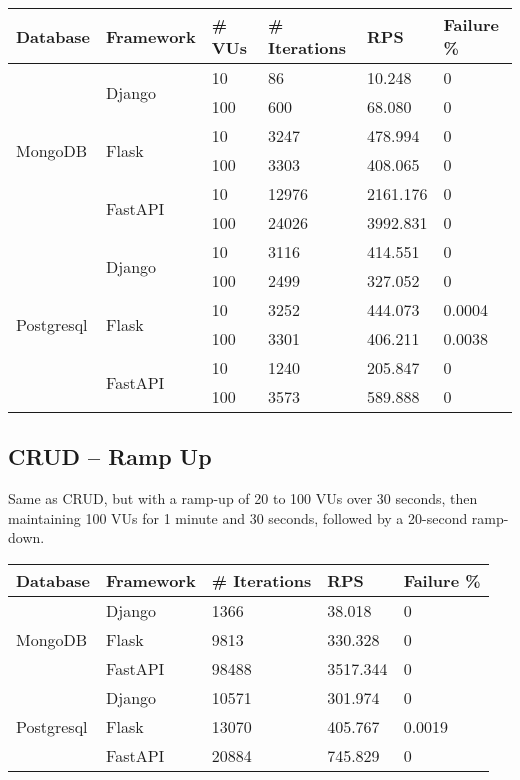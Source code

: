 \documentclass[12pt,onecolumn,a4paper,titlepage]{article}
\begin{document}
{\renewcommand{\arraystretch}{1.5}
\begin{tabular}{| p{1.8cm} | p{2cm} | p{1.3cm} | p{2cm} | p{1.9cm} | p{2cm} |} 
    \hline
    Database & Framework & \# VUs & \# \footnotesize{Iterations} & RPS & \footnotesize{Failure \%} \\
    \hline
    \multirow{6}{*}{MongoDB} & \multirow{2}{*}{Django} & 10 & 86 & 10.248 & 0\\
    & & 100 & 600 & 68.080 & 0\\
    & \multirow{2}{*}{Flask} & 10 & 3247 & 478.994 & 0\\
    & & 100 & 3303 & 408.065 & 0\\
    & \multirow{2}{*}{FastAPI} & 10 & 12976 & 2161.176 & 0\\
    & & 100 & 24026 & 3992.831 & 0\\
    \hline
    \multirow{6}{*}{Postgresql} & \multirow{2}{*}{Django} & 10 & 3116 & 414.551 & 0\\
    & & 100 & 2499 & 327.052 & 0\\
    & \multirow{2}{*}{Flask} & 10 & 3252 & 444.073 & 0.0004\\
    & & 100 & 3301 & 406.211 & 0.0038\\
    & \multirow{2}{*}{FastAPI} & 10 & 1240 & 205.847 & 0\\
    & & 100 & 3573 & 589.888 & 0\\
    \hline
\end{tabular}
}

\pagebreak
\subsection{CRUD -- Ramp Up}

Same as CRUD, but with a ramp-up of 20 to 100 VUs over 30 seconds, then maintaining 100 VUs for 1 minute and 30 seconds, followed by a 20-second ramp-down.

\vspace*{1cm}

{\renewcommand{\arraystretch}{1.5}
\begin{tabular}{| p{1.8cm} | p{2cm} | p{2cm} | p{1.9cm} | p{2cm} |} 
    \hline
    Database & Framework & \# \footnotesize{Iterations} & RPS & \footnotesize{Failure \%} \\
    \hline
    \multirow{3}{*}{MongoDB} & Django & 1366 & 38.018 & 0\\
    & Flask & 9813 & 330.328 & 0\\
    & FastAPI & 98488 & 3517.344 & 0\\
    \hline
    \multirow{3}{*}{Postgresql} & Django & 10571 & 301.974 & 0\\
    & Flask & 13070 & 405.767 & 0.0019\\
    & FastAPI & 20884 & 745.829 & 0\\
    \hline
\end{tabular}
}
\end{document}
